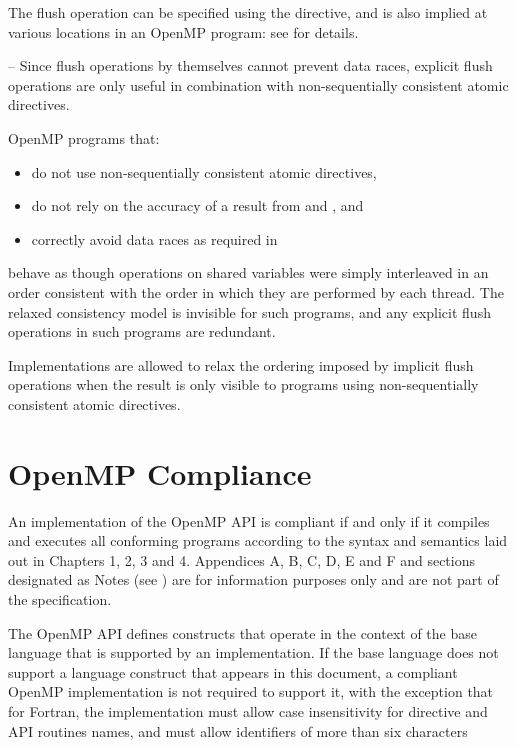 The flush operation can be specified using the  directive, and is also implied at 
various locations in an OpenMP program: see  for details.

\notestart
\noteheader – Since flush operations by themselves cannot prevent data races, explicit flush 
operations are only useful in combination with non-sequentially consistent atomic 
directives.
\noteend

OpenMP programs that:

\begin{itemize}[rightmargin=11ex]
\item do not use non-sequentially consistent atomic directives,

\item do not rely on the accuracy of a  result from 
 and , and

\item correctly avoid data races as required in  
\end{itemize}

behave as though operations on shared variables were simply interleaved in an order 
consistent with the order in which they are performed by each thread. The relaxed 
consistency model is invisible for such programs, and any explicit flush operations in 
such programs are redundant.

Implementations are allowed to relax the ordering imposed by implicit flush operations 
when the result is only visible to programs using non-sequentially consistent atomic 
directives.








\section{OpenMP Compliance}
\label{sec:OpenMP Compliance}
An implementation of the OpenMP API is compliant if and only if it compiles and 
executes all conforming programs according to the syntax and semantics laid out in 
Chapters 1, 2, 3 and 4. Appendices A, B, C, D, E and F and sections designated as Notes 
(see ) 
are for information purposes only and are not part of the 
specification.

The OpenMP API defines constructs that operate in the context of the base language that 
is supported by an implementation. If the base language does not support a language 
construct that appears in this document, a compliant OpenMP implementation is not 
required to support it, with the exception that for Fortran, the implementation must 
allow case insensitivity for directive and API routines names, and must allow identifiers 
of more than six characters

